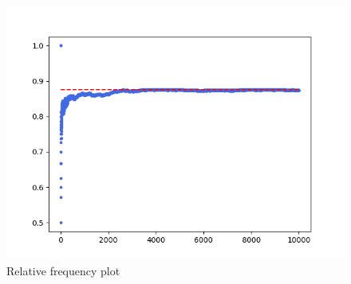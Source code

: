 \documentclass[journal]{IEEEtran}
\begin{document}
\begin{figure}[h!]
  \centering
  \includegraphics[width=0.7\columnwidth]{figs/sim.png}
  \caption{Relative frequency plot}
  \label{label}
\end{figure}
\end{document}
